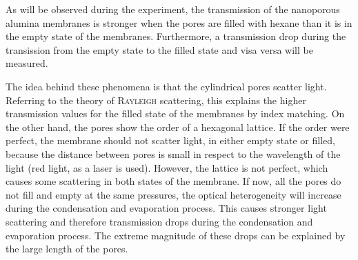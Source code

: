 \documentclass[../thesis.tex]{subfiles}
\begin{document}
      As will be observed during the experiment, the transmission of the nanoporous alumina membranes is stronger when the pores are filled with hexane than it is in the empty state of the membranes. Furthermore, a transmission drop during the transission from the empty state to the filled state and visa versa will be measured.

      The idea behind these phenomena is that the cylindrical pores scatter light. Referring to the theory of \textsc{Rayleigh} scattering, this explains the higher transmission values for the filled state of the membranes by index matching. On the other hand, the pores show the order of a hexagonal lattice. If the order were perfect, the membrane should not scatter light, in either empty state or filled, because the distance between pores is small in respect to the wavelength of the light (red light, as a  laser is used). However, the lattice is not perfect, which causes some scattering in both states of the membrane. If now, all the pores do not fill and empty at the same pressures, the optical heterogeneity will increase during the condensation and evaporation process. This causes stronger light scattering and therefore transmission drops during the condensation and evaporation process. The extreme magnitude of these drops can be explained by the large length of the pores.
\end{document}
